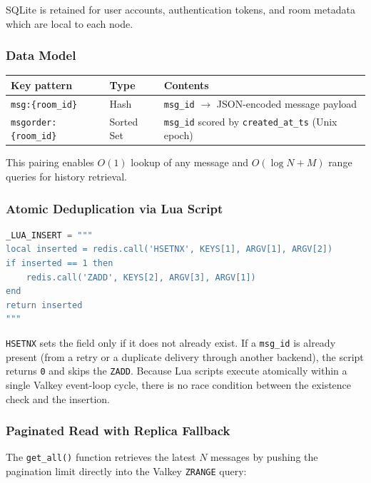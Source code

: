 \documentclass[12pt,a4paper]{article}
\begin{document}
SQLite is retained for user accounts, authentication tokens, and room metadata which are local to each node.

\subsubsection{Data Model}

\begin{center}
\begin{tabular}{lll}
\toprule
\textbf{Key pattern} & \textbf{Type} & \textbf{Contents} \\
\midrule
\texttt{msg:\{room\_id\}} & Hash & \texttt{msg\_id} $\to$ JSON-encoded message payload \\
\texttt{msgorder:\{room\_id\}} & Sorted Set & \texttt{msg\_id} scored by \texttt{created\_at\_ts} (Unix epoch) \\
\bottomrule
\end{tabular}
\end{center}

This pairing enables $O(1)$ lookup of any message and $O(\log N + M)$ range queries for history retrieval.

\subsubsection{Atomic Deduplication via Lua Script}

\begin{lstlisting}[language=Python, caption={Lua script in feed\_store.py for atomic idempotent insertion}]
_LUA_INSERT = """
local inserted = redis.call('HSETNX', KEYS[1], ARGV[1], ARGV[2])
if inserted == 1 then
    redis.call('ZADD', KEYS[2], ARGV[3], ARGV[1])
end
return inserted
"""
\end{lstlisting}

\texttt{HSETNX} sets the field only if it does not already exist. If a \texttt{msg\_id} is already present (from a retry or a duplicate delivery through another backend), the script returns \texttt{0} and skips the \texttt{ZADD}. Because Lua scripts execute atomically within a single Valkey event-loop cycle, there is no race condition between the existence check and the insertion.

\subsubsection{Paginated Read with Replica Fallback}

The \texttt{get\_all()} function retrieves the latest $N$ messages by pushing the pagination limit directly into the Valkey \texttt{ZRANGE} query:
\end{document}
